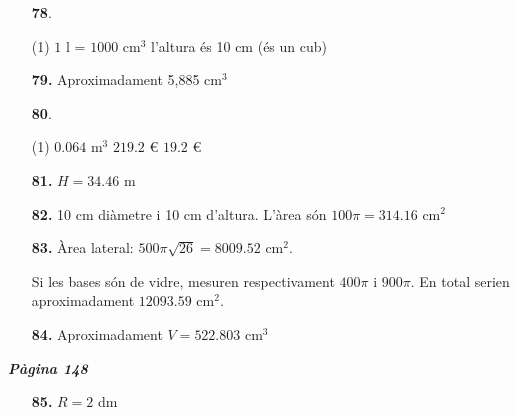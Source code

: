 \documentclass[a4paper, pdf, twoside]{book}
\begin{document}
\begin{multicols}{2}
\begin{enumerate}

 \item[\fontfamily{phv}\selectfont\color{blue}\textbf{78}. ] 
 \begin{tasks}[column-sep=1em, item-indent=1.3333em](1)
	 \task $1$ l = $1000$ cm$^3$
	 \task l'altura és 10 cm (és un cub)
\end{tasks}
\vspace{0.25cm}
\item[\fontfamily{phv}\selectfont\color{blue}\textbf{79. }] 
Aproximadament 5,885 cm$^3$
\vspace{0.25cm}



 \item[\fontfamily{phv}\selectfont\color{blue}\textbf{80}. ] 
 \begin{tasks}[column-sep=1em, item-indent=1.3333em](1)
	 \task $0.064$ m$^3$
	 \task $219.2$ \euro {}
	 \task $19.2$ \euro {}
\end{tasks}
\vspace{0.25cm}
\item[\fontfamily{phv}\selectfont\color{blue}\textbf{81. }] 
$H=34.46$ m
\vspace{0.25cm}
\item[\fontfamily{phv}\selectfont\color{blue}\textbf{82. }] 
10 cm diàmetre i 10 cm d'altura. L'àrea són $100\pi =314.16$ cm$^2$
\vspace{0.25cm}
\item[\fontfamily{phv}\selectfont\color{blue}\textbf{83. }] 
 Àrea lateral: $500\pi \sqrt {26} = 8009.52$ cm$^2$.\par Si les bases són de vidre, mesuren respectivament $400\pi $ i $900\pi $. En total serien aproximadament $12093.59$ cm$^2$.
\vspace{0.25cm}
\item[\fontfamily{phv}\selectfont\color{blue}\textbf{84. }] 
Aproximadament $V=522.803$ cm$^3$
 \end{enumerate}
\vspace{0.3cm}


{\textbf{\em Pàgina 148}} \hrulefill
\begin{enumerate}
\vspace{0.25cm}
\item[\fontfamily{phv}\selectfont\color{blue}\textbf{85. }] 
$R=2$ dm
 \end{enumerate}
\begin{enumerate}
\vspace{0.25cm}



\end{enumerate}
\end{multicols}
\end{document}
